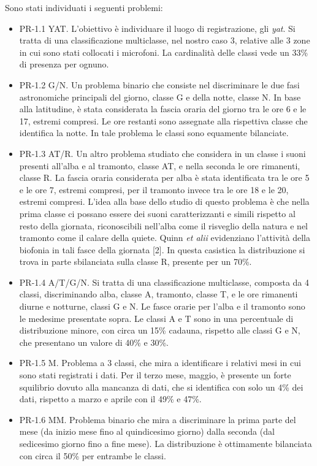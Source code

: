 Sono stati individuati i seguenti problemi:
\begin{itemize}
\item{PR-1.1 YAT. L’obiettivo è individuare il luogo di registrazione, gli \textit{yat}. Si tratta di una
classificazione multiclasse, nel nostro caso 3, relative alle 3 zone in cui sono stati
collocati i microfoni. La cardinalità delle classi vede un 33\% di presenza per ognuno.}
\item{PR-1.2 G/N. Un problema binario che consiste nel discriminare le due fasi
astronomiche principali del giorno, classe G e della notte, classe N. In base alla
latitudine, è stata considerata la fascia oraria del giorno tra le ore 6 e le 17, estremi
compresi. Le ore restanti sono assegnate alla rispettiva classe che identifica la notte.
In tale problema le classi sono equamente bilanciate. }
\item{PR-1.3 AT/R. Un altro problema studiato che considera in un classe i suoni presenti
all’alba e al tramonto, classe AT, e nella seconda le ore rimanenti, classe R. La fascia
oraria considerata per alba è stata identificata tra le ore 5 e le ore 7, estremi compresi,
per il tramonto invece tra le ore 18 e le 20, estremi compresi. L’idea alla base dello
studio di questo problema è che nella prima classe ci possano essere dei suoni
caratterizzanti e simili rispetto al resto della giornata, riconoscibili nell’alba come il
risveglio della natura e nel tramonto come il calare della quiete. Quinn \textit{et alii}
evidenziano l’attività della biofonia in tali fasce della giornata [2]. In questa casistica
la distribuzione si trova in parte sbilanciata sulla classe R, presente per un 70\%.}
\item{PR-1.4 A/T/G/N. Si tratta di una classificazione multiclasse, composta da 4 classi,
discriminando alba, classe A, tramonto, classe T, e le ore rimanenti diurne e notturne,
classi G e N. Le fasce orarie per l’alba e il tramonto sono le medesime presentate
sopra. Le classi A e T sono in una percentuale di distribuzione minore, con circa un
15\% cadauna, rispetto alle classi G e N, che presentano un valore di 40\% e 30\%.}
\item{PR-1.5 M. Problema a 3 classi, che mira a identificare i relativi mesi in cui sono stati
registrati i dati. Per il terzo mese, maggio, è presente un forte squilibrio dovuto alla
mancanza di dati, che si identifica con solo un 4\% dei dati, rispetto a marzo e aprile
con il 49\% e 47\%.}
\item{PR-1.6 MM. Problema binario che mira a discriminare la prima parte del mese (da
inizio mese fino al quindicesimo giorno) dalla seconda (dal sedicesimo giorno fino a
fine mese). La distribuzione è ottimamente bilanciata con circa il 50\% per entrambe le
classi. }
\end{itemize}

